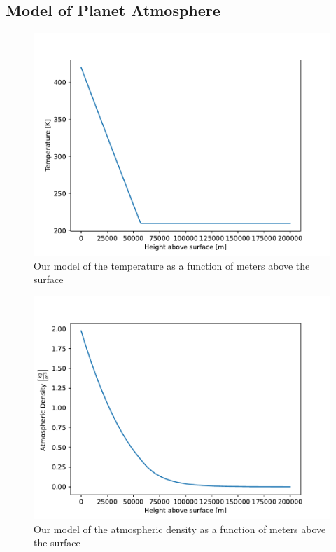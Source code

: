 \documentclass[reprint,english,notitlepage]{revtex4-2}
\begin{document}
\subsection{Model of Planet Atmosphere}
\begin{figure}[h!]
  \centering
  \includegraphics[scale = .4]{Figures/Temperature plot}
  \caption{Our model of the temperature as a function of meters above the surface }
  \label{fig: Temperature}
\end{figure}

\begin{figure}[h!]
  \centering
  \includegraphics[scale = .4]{Figures/Density plot}
  \caption{Our model of the atmospheric density as a function of meters above the surface }
  \label{fig: Density}
\end{figure}
\end{document}
